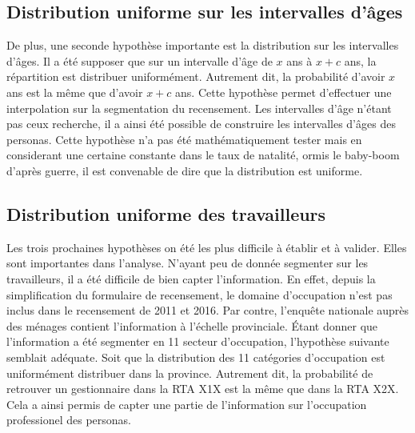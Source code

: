 \documentclass[11pt,french]{report}\usepackage[]{graphicx}\usepackage[]{color}
\begin{document}
\subsection*{Distribution uniforme sur les intervalles d'âges}
De plus, une seconde hypothèse importante est la distribution sur les intervalles d'âges. Il a été supposer que sur un intervalle d'âge de $x$ ans à $x + c$ ans, la répartition est distribuer uniformément. Autrement dit, la probabilité d'avoir $x$ ans est la même que d'avoir $x + c$ ans. Cette hypothèse permet d'effectuer une interpolation sur la segmentation du recensement. Les intervalles d'âge n'étant pas ceux recherche, il a ainsi été possible de construire les intervalles d'âges des personas. Cette hypothèse n'a pas été mathématiquement tester mais en considerant une certaine constante dans le taux de natalité, ormis le baby-boom d'après guerre, il est convenable de dire que la distribution est uniforme.

\subsection*{Distribution uniforme des travailleurs}
Les trois prochaines hypothèses on été les plus difficile à établir et à valider. Elles sont importantes dans l'analyse. N'ayant peu de donnée segmenter sur les travailleurs, il a été difficile de bien capter l'information. En effet, depuis la simplification du formulaire de recensement, le domaine d'occupation n'est pas inclus dans le recensement de 2011 et 2016. Par contre, l'enquête nationale auprès des ménages contient l'information à l'échelle provinciale. Étant donner que l'information a été segmenter en 11 secteur d'occupation, l'hypothèse suivante semblait adéquate. Soit que la distribution des 11 catégories d'occupation est uniformément distribuer dans la province. Autrement dit, la probabilité de retrouver un gestionnaire dans la RTA X1X est la même que dans la RTA X2X. Cela a ainsi permis de capter une partie de l'information sur l'occupation professionel des personas. 
\end{document}
